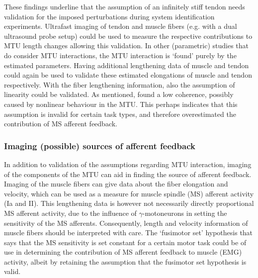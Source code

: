These findings underline that the assumption of an infinitely stiff tendon needs validation for the imposed perturbations during system identification experiments. Ultrafast imaging of tendon and muscle fibers (e.g. with a dual ultrasound probe setup) could be used to measure the respective contributions to MTU length changes allowing this validation. In other (parametric) studies that do consider MTU interactions, the MTU interaction is `found' purely by the estimated parameters. Having additional lengthening data of muscle and tendon could again be used to validate these estimated elongations of  muscle and tendon respectively. With the fiber lengthening information, also the assumption of linearity could be validated. As mentioned, \citet{ossenkoppele_using_2018} found a low coherence, possibly caused by nonlinear behaviour in the MTU. This perhaps indicates that this assumption is invalid for certain task types, and therefore overestimated the contribution of MS afferent feedback. 



\subsubsection{Imaging (possible) sources of afferent feedback}
In addition to validation of the assumptions regarding MTU interaction, imaging of the components of the MTU can aid in finding the source of afferent feedback. Imaging of the muscle fibers can give data about the fiber elongation and velocity, which can be used as a measure for muscle spindle (MS) afferent activity (Ia and II). This lengthening data is however not necessarily directly proportional MS afferent activity, due to the influence of $\gamma$-motoneurons in setting the sensitivity of the MS afferents. Consequently, length and velocity information of muscle fibers should be interpreted with care. The `fusimotor set' hypothesis that says that the  MS sensitivity is set constant for a certain motor task could be of use in determining the contribution of MS afferent feedback to muscle (EMG) activity, albeit by retaining the assumption that the fusimotor set hypothesis is valid. 

